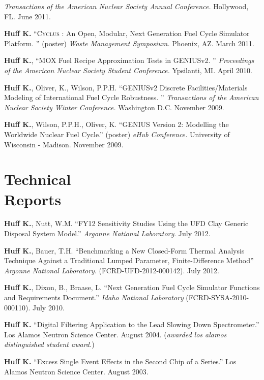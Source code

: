 \documentclass[margin,line]{resume}
\newcommand{\Cyclus}{\textsc{Cyclus }}
\begin{document}
\begin{resume}
\begin{bibenum}
         \emph{Transactions of the American Nuclear Society Annual Conference.} 
        Hollywood, FL. June 2011.
      \item \textbf{Huff K.} ``\Cyclus: An Open, Modular, Next Generation Fuel Cycle Simulator Platform. ''
        (poster)  \emph{Waste Management Symposium.} Phoenix, AZ. March 
        2011.
      \item \textbf{Huff K.}, ``MOX Fuel Recipe Approximation Tests in GENIUSv2. ''
         \emph{Proceedings of the American Nuclear Society Student Conference.} 
        Ypsilanti, MI. April 2010.
    \pagebreak
      \item \textbf{Huff K.}, Oliver, K., Wilson, P.P.H. ``GENIUSv2 Discrete Facilities/Materials Modeling of International 
        Fuel Cycle Robustness. ''
         \emph{Transactions of the American Nuclear Society Winter Conference.} 
        Washington D.C. November 2009. 
      \item \textbf{Huff K.}, Wilson, P.P.H., Oliver, K. ``GENIUS Version 2: Modelling the Worldwide Nuclear Fuel Cycle.'' 
        (poster)  \emph{eHub Conference.} University of Wisconsin - 
        Madison. November 2009.
    \end{bibenum}

    \section{\mysidestyle Technical\\Reports}
    \begin{bibenum}
      \item \textbf{Huff K.}, Nutt, W.M. ``FY12 Sensitivity Studies Using the UFD Clay Generic Disposal System Model.'' 
        \emph{Argonne National Laboratory}. July 2012.
      \item \textbf{Huff K.}, Bauer, T.H. ``Benchmarking a New Closed-Form Thermal Analysis Technique Against a Traditional
        Lumped Parameter, Finite-Difference Method'' \emph{Argonne National Laboratory}. (FCRD-UFD-2012-000142). July 2012.
      \item \textbf{Huff K.}, Dixon, B., Braase, L. ``Next Generation Fuel Cycle Simulator Functions and Requirements Document.'' 
        \emph{Idaho National Laboratory} (FCRD-SYSA-2010-000110). July 2010. 
      \item \textbf{Huff K.} ``Digital Filtering Application to the Lead Slowing Down 
        Spectrometer.'' Los Alamos Neutron Science Center. August 2004.  %
        (\emph{awarded los alamos distinguished student award.}) 
      \item \textbf{Huff K.} ``Excess Single Event Effects in the Second Chip of a Series.'' 
        Los Alamos Neutron Science Center. August 2003. 
    \end{bibenum}

\end{resume}
\end{document}
